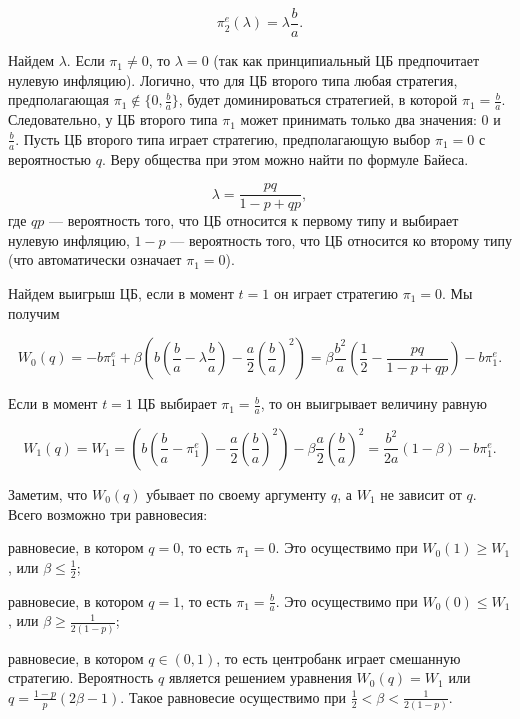 \documentclass[14pt,a4paper, oneside]{extreport}
\newcounter{notes}
\renewenvironment{enumerate}%
{\begin{list}{\arabic{notes})} {\usecounter{notes}%
\setlength{\parsep}{0em}%
\setlength{\itemsep}{0em}%
\setlength{\topsep}{0.75ex}%
\setlength{\parskip}{0em}
}}%
{\end{list}}
\renewcommand{\le}{\leqslant}
\renewcommand{\ge}{\geqslant}
\theoremstyle{plain}              %
\theoremstyle{definition}         %
\begin{document}
\begin{equation}
\pi^e_2(\lambda) = \lambda \frac{b}{a}.
\end{equation}

Найдем $\lambda$. Если $\pi_1 \ne 0$, то $\lambda=0$ (так как принципиальный ЦБ предпочитает нулевую инфляцию). Логично, что для ЦБ второго типа любая стратегия, предполагающая $\pi_1 \notin \{0,\frac{b}{a}\}$, будет доминироваться стратегией, в которой $\pi_1 = \frac{b}{a}.$ Следовательно, у ЦБ второго типа $\pi_1$ может принимать только два значения: $0$ и $\frac{b}{a}$. Пусть ЦБ второго типа играет стратегию, предполагающую выбор $\pi_1 = 0$ с вероятностью $q$. Веру общества при этом можно найти по формуле Байеса. 

\begin{equation}
\lambda = \frac{p q}{1-p+qp}, 
\end{equation}
где $qp$ --- вероятность того, что ЦБ относится к первому типу и выбирает нулевую инфляцию, $1-p$ --- вероятность того, что ЦБ относится ко второму типу (что автоматически означает $\pi_1=0$). 

Найдем выигрыш ЦБ, если в момент $t=1$ он играет стратегию $\pi_1 = 0$. Мы получим

\begin{equation}
W_0(q) = -b \pi_1^e + \beta \left(b \left(\frac{b}{a}-\lambda \frac{b}{a} \right) - \frac{a}{2} \left(\frac{b}{a} \right)^2 \right) = \beta \frac{b^2}{a} \left(\frac{1}{2} - \frac{p q}{1-p+qp} \right)-b \pi_1^e.
\end{equation}

Если в момент $t=1$ ЦБ выбирает $\pi_1 = \frac{b}{a}$, то он выигрывает величину равную 

\begin{equation}
W_1(q) = W_1 = \left(b \left(\frac{b}{a}-\pi_1^e \right) - \frac{a}{2} \left(\frac{b}{a} \right)^2 \right) - \beta \frac{a}{2} \left(\frac{b}{a}\right)^2 = \frac{b^2}{2a} (1-\beta) - b \pi_1^e.
\end{equation}

Заметим, что $W_0(q)$ убывает по своему аргументу $q$, а $W_1$ не зависит от $q$. Всего возможно три равновесия:

\begin{enumerate}
\item равновесие, в котором $q=0$, то есть $\pi_1 = 0$. Это осуществимо при $W_0(1) \ge W_1$, или $\beta \le \frac{1}{2}$;

\item равновесие, в котором $q=1$, то есть $\pi_1 = \frac{b}{a}$. Это осуществимо при $W_0(0) \le W_1$, или $\beta \ge \frac{1}{2(1-p)}$;

\item равновесие, в котором $q \in (0,1)$, то есть центробанк играет смешанную стратегию. Вероятность $q$ является решением уравнения $W_0(q) = W_1$ или $q= \frac{1-p}{p} (2 \beta -1)$. Такое равновесие осуществимо при $\frac{1}{2} < \beta < \frac{1}{2(1-p)}.$

\end{enumerate}
\end{document}
